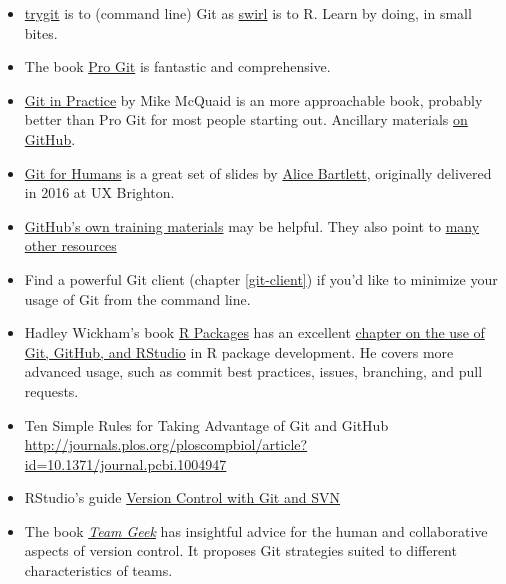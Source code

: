 \documentclass[
]{book}
\begin{document}
\begin{itemize}
\item
  \href{https://try.github.io/levels/1/challenges/1}{trygit} is to (command line) Git as \href{http://swirlstats.com}{swirl} is to R. Learn by doing, in small bites.
\item
  The book \href{http://git-scm.com/book}{Pro Git} is fantastic and comprehensive.
\item
  \href{https://www.manning.com/books/git-in-practice}{Git in Practice} by Mike McQuaid is an more approachable book, probably better than Pro Git for most people starting out. Ancillary materials \href{https://github.com/MikeMcQuaid/GitInPractice}{on GitHub}.
\item
  \href{https://speakerdeck.com/alicebartlett/git-for-humans}{Git for Humans} is a great set of slides by \href{https://alicebartlett.co.uk}{Alice Bartlett}, originally delivered in 2016 at UX Brighton.
\item
  \href{http://training.github.com/kit/}{GitHub's own training materials} may be helpful. They also point to \href{https://help.github.com/articles/what-are-other-good-resources-for-learning-git-and-github}{many other resources}
\item
  Find a powerful Git client (chapter \ref{git-client}) if you'd like to minimize your usage of Git from the command line.
\item
  Hadley Wickham's book \href{http://r-pkgs.had.co.nz}{R Packages} has an excellent \href{http://r-pkgs.had.co.nz/git.html}{chapter on the use of Git, GitHub, and RStudio} in R package development. He covers more advanced usage, such as commit best practices, issues, branching, and pull requests.
\item
  Ten Simple Rules for Taking Advantage of Git and GitHub \url{http://journals.plos.org/ploscompbiol/article?id=10.1371/journal.pcbi.1004947}
\item
  RStudio's guide \href{https://support.rstudio.com/hc/en-us/articles/200532077-Version-Control-with-Git-and-SVN}{Version Control with Git and SVN}
\item
  The book \emph{\href{http://shop.oreilly.com/product/0636920018025.do}{Team Geek}} has insightful advice for the human and collaborative aspects of version control. It proposes Git strategies suited to different characteristics of teams.
\end{itemize}

  
\end{document}
